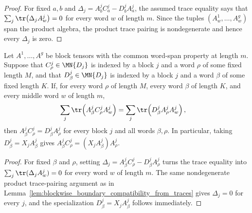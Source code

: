 \begin{proof}
    \leanok
    For fixed $a,b$ and $\Delta_j=A^j_bC^j_a-D^j_bA^j_a$, the assumed trace
    equality says that
    $\sum_j \tr\!\left(\Delta_jA^j_w\right) = 0$
    for every word $w$ of length $m$. Since the tuples
    $(A^1_w,\ldots,A^g_w)$ span the product algebra, the product trace
    pairing is nondegenerate and hence every $\Delta_j$ is zero.
\end{proof}

\begin{lemma}
    \label{lem:blockwise_word_boundary_compatibility_from_traces}
    \leanok
    Let $A^1,\ldots,A^g$ be block tensors with the common word-span property
    at length $m$. Suppose that $C^j_\rho\in\MN{D_j}$ is indexed by a block
    $j$ and a word $\rho$ of some fixed length $M$, and that
    $D^j_\beta\in\MN{D_j}$ is indexed by a block $j$ and a word $\beta$ of
    some fixed length $K$. If, for every word $\rho$ of length $M$, every
    word $\beta$ of length $K$, and every middle word $w$ of length $m$,
    \begin{align}
        \sum_j\tr\!\left(A^j_\beta C^j_\rho A^j_w\right)
         & =
        \sum_j\tr\!\left(D^j_\beta A^j_\rho A^j_w\right),
        \notag
    \end{align}
    then
    $A^j_\beta C^j_\rho = D^j_\beta A^j_\rho$
    for every block $j$ and all words $\beta,\rho$. In particular, taking
    $D^j_\beta=X_jA^j_\beta$ gives
    $A^j_\beta C^j_\rho = (X_jA^j_\beta)A^j_\rho$.
\end{lemma}

\begin{proof}
    \leanok
    For fixed $\beta$ and $\rho$, setting
    $\Delta_j=A^j_\beta C^j_\rho-D^j_\beta A^j_\rho$ turns the trace equality
    into
    $\sum_j\tr(\Delta_jA^j_w) = 0$
    for every word $w$ of length $m$. The same nondegenerate product
    trace-pairing argument as in
    Lemma~\ref{lem:blockwise_boundary_compatibility_from_traces} gives
    $\Delta_j=0$ for every $j$, and the specialization
    $D^j_\beta=X_jA^j_\beta$ follows immediately.
\end{proof}

